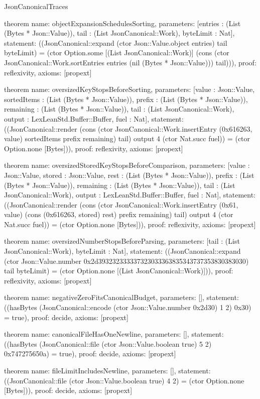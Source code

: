 \begin{lexlean}{JsonCanonicalTraces}
\begin{semanticmodule}
theorem{
 name: objectExpansionSchedulesSorting,
 parameters: [entries : (List (Bytes * Json::Value)), tail : (List JsonCanonical::Work), byteLimit : Nat],
 statement: ((JsonCanonical::expand (ctor Json::Value.object entries) tail byteLimit) = (ctor Option.some [(List JsonCanonical::Work)] (cons (ctor JsonCanonical::Work.sortEntries entries (nil (Bytes * Json::Value))) tail))),
 proof: reflexivity{},
 axioms: [propext]
}

theorem{
 name: oversizedKeyStopsBeforeSorting,
 parameters: [value : Json::Value, sortedItems : (List (Bytes * Json::Value)), prefix : (List (Bytes * Json::Value)), remaining : (List (Bytes * Json::Value)), tail : (List JsonCanonical::Work), output : LexLeanStd.Buffer::Buffer, fuel : Nat],
 statement: ((JsonCanonical::render (cons (ctor JsonCanonical::Work.insertEntry (0x616263, value) sortedItems prefix remaining) tail) output 4 (ctor Nat.succ fuel)) = (ctor Option.none [Bytes])),
 proof: reflexivity{},
 axioms: [propext]
}

theorem{
 name: oversizedStoredKeyStopsBeforeComparison,
 parameters: [value : Json::Value, stored : Json::Value, rest : (List (Bytes * Json::Value)), prefix : (List (Bytes * Json::Value)), remaining : (List (Bytes * Json::Value)), tail : (List JsonCanonical::Work), output : LexLeanStd.Buffer::Buffer, fuel : Nat],
 statement: ((JsonCanonical::render (cons (ctor JsonCanonical::Work.insertEntry (0x61, value) (cons (0x616263, stored) rest) prefix remaining) tail) output 4 (ctor Nat.succ fuel)) = (ctor Option.none [Bytes])),
 proof: reflexivity{},
 axioms: [propext]
}

theorem{
 name: oversizedNumberStopsBeforeParsing,
 parameters: [tail : (List JsonCanonical::Work), byteLimit : Nat],
 statement: ((JsonCanonical::expand (ctor Json::Value.number 0x2d393232333337323033363835343737353830383030) tail byteLimit) = (ctor Option.none [(List JsonCanonical::Work)])),
 proof: reflexivity{},
 axioms: [propext]
}

theorem{
 name: negativeZeroFitsCanonicalBudget,
 parameters: [],
 statement: ((hasBytes (JsonCanonical::encode (ctor Json::Value.number 0x2d30) 1 2) 0x30) = true),
 proof: decide{},
 axioms: [propext]
}

theorem{
 name: canonicalFileHasOneNewline,
 parameters: [],
 statement: ((hasBytes (JsonCanonical::file (ctor Json::Value.boolean true) 5 2) 0x747275650a) = true),
 proof: decide{},
 axioms: [propext]
}

theorem{
 name: fileLimitIncludesNewline,
 parameters: [],
 statement: ((JsonCanonical::file (ctor Json::Value.boolean true) 4 2) = (ctor Option.none [Bytes])),
 proof: decide{},
 axioms: [propext]
}

\end{semanticmodule}
\end{lexlean}
